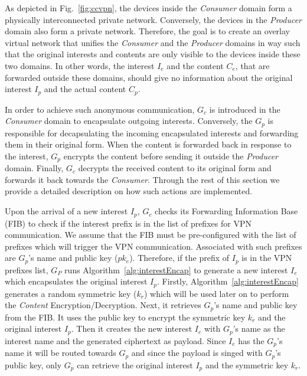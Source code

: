 As depicted in Fig.~\ref{fig:ccvpn}, the devices inside the \textit{Consumer} domain form a physically interconnected private network. Conversely, the devices in the \textit{Producer} domain also form a private network. Therefore, the goal is to create an overlay virtual network that unifies the \textit{Consumer} and the \textit{Producer} domains in way such that the original interests and contents are only visible to the devices inside these two domains. In other words, the interest $I_e$ and the content $C_e$, that are forwarded outside these domains, should give no information about the original interest $I_p$ and the actual content $C_p$.

In order to achieve such anonymous communication, $G_c$ is introduced in the \textit{Consumer} domain to encapsulate outgoing interests. Conversely, the $G_p$ is responsible for decapsulating the incoming encapsulated interests and forwarding them in their original form. When the content is forwarded back in response to the interest, $G_p$ encrypts the content before sending it outside the \textit{Producer} domain. Finally, $G_c$ decrypts the received content to its original form and forwards it back towards the \textit{Consumer}. Through the rest of this section we provide a detailed description on how such actions are implemented.

Upon the arrival of a new interest $I_p$, $G_c$ checks its Forwarding Information Base (FIB) to check if the interest prefix is in the list of prefixes for VPN communication. We assume that the FIB must be pre-configured with the list of prefixes which will trigger the VPN communication. Associated with such prefixes are $G_p$'s name and public key ($pk_e$). Therefore, if the prefix of $I_p$ is in the VPN prefixes list, $G_P$ runs Algorithm~\ref{alg:interestEncap} to generate a new interest $I_e$ which encapsulates the original interest $I_p$. Firstly, Algorithm~\ref{alg:interestEncap} generates a random symmetric key ($k_r$) which will be used later on to perform the \textit{Content} Encryption/Decryption. Next, it retrieves $G_p$'s name and public key from the FIB. It uses the public key to encrypt the symmetric key $k_r$ and the original interest $I_p$. Then it creates the new interest $I_e$ with $G_p$'s name as the interest name and the generated ciphertext as payload. Since $I_e$ has  the $G_p$'s name it will be routed towards $G_p$ and since the payload is singed with $G_p$'s public key, only $G_p$ can retrieve the original interest $I_p$ and the symmetric key $k_r$.

